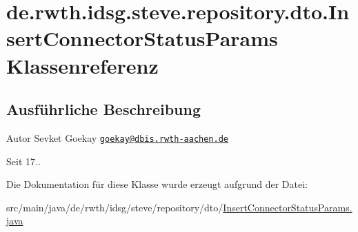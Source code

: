 \hypertarget{classde_1_1rwth_1_1idsg_1_1steve_1_1repository_1_1dto_1_1_insert_connector_status_params}{\section{de.\+rwth.\+idsg.\+steve.\+repository.\+dto.\+Insert\+Connector\+Status\+Params Klassenreferenz}
\label{classde_1_1rwth_1_1idsg_1_1steve_1_1repository_1_1dto_1_1_insert_connector_status_params}
}


\subsection{Ausführliche Beschreibung}
\begin{DoxyAuthor}{Autor}
Sevket Goekay \href{mailto:goekay@dbis.rwth-aachen.de}{\tt goekay@dbis.\+rwth-\/aachen.\+de} 
\end{DoxyAuthor}
\begin{DoxySince}{Seit}
17.. 
\end{DoxySince}


Die Dokumentation für diese Klasse wurde erzeugt aufgrund der Datei\+:\begin{DoxyCompactItemize}
\item 
src/main/java/de/rwth/idsg/steve/repository/dto/\hyperlink{_insert_connector_status_params_8java}{Insert\+Connector\+Status\+Params.\+java}\end{DoxyCompactItemize}
